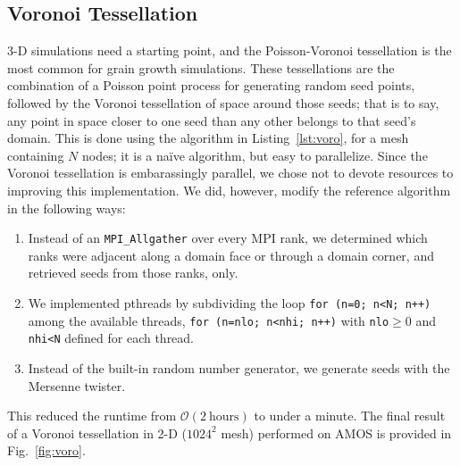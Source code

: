 \documentclass[11pt]{article}
\newcommand{\code}[1]{\colorbox{codebg}{\texttt{\footnotesize{#1}}}}
\begin{document}
\begin{multicols*}{2}
\subsection*{Voronoi Tessellation\label{sec:pvt}}
3-D simulations need a starting point, and the Poisson-Voronoi tessellation is the most common for grain growth simulations.
These tessellations are the combination of a Poisson point process for generating random seed points, followed by the Voronoi tessellation of space around those seeds;
that is to say, any point in space closer to one seed than any other belongs to that seed's domain.
This is done using the algorithm in Listing~\ref{lst:voro}, for a mesh containing $N$ nodes; it is a na\"ive algorithm, but easy to parallelize.
Since the Voronoi tessellation is embarassingly parallel, we chose not to devote resources to improving this implementation.
We did, however, modify the reference algorithm in the following ways:
\begin{enumerate}
 \item Instead of an \texttt{MPI\_Allgather} over every MPI rank, we determined which ranks were adjacent along a domain face or through a domain corner, and retrieved seeds from those ranks, only.
 \item We implemented pthreads by subdividing the loop \code{for (n=0; n<N; n++)} among the available threads, \code{for (n=nlo; n<nhi; n++)} with \texttt{nlo}$\geq0$ and \texttt{nhi<N} defined for each thread.
 \item Instead of the built-in random number generator, we generate seeds with the Mersenne twister.
\end{enumerate}
This reduced the runtime from $\mathcal{O}(2\ \mathrm{hours})$ to under a minute.
The final result of a Voronoi tessellation in 2-D ($1024^2$ mesh) performed on AMOS is provided in Fig.~\ref{fig:voro}.


\end{multicols*}
\end{document}
